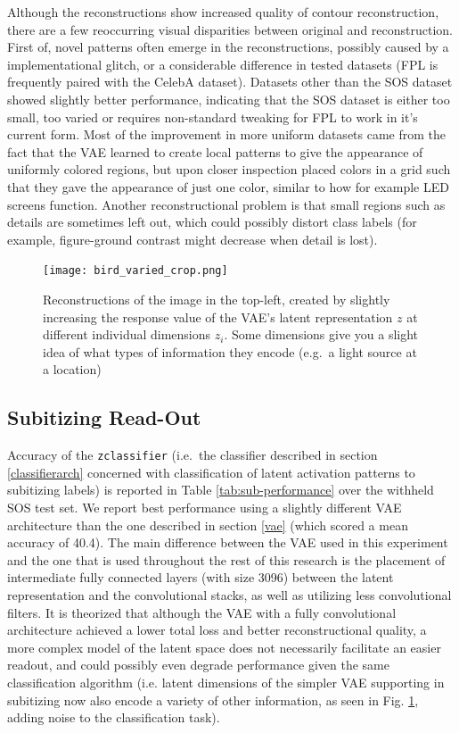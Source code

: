 \documentclass[twocolumn]{article}
\begin{document}
Although the reconstructions show increased quality of contour
reconstruction, there are a few reoccurring visual disparities between
original and reconstruction. First of, novel patterns often emerge in
the reconstructions, possibly caused by a implementational glitch, or a
considerable difference in tested datasets (FPL is frequently paired
with the CelebA \citet{liu2015deep} dataset). Datasets other than the
SOS dataset showed slightly better performance, indicating that the SOS
dataset is either too small, too varied or requires non-standard tweaking
for FPL to work in it's current form. Most of the improvement in more
uniform datasets came from the fact that the VAE learned to create 
local patterns to give the appearance of uniformly colored regions, but
upon closer inspection placed colors in a grid such that they
gave the appearance of just one color, similar to how for example LED
screens function. Another reconstructional problem is that small regions such as details are sometimes left out, which
could possibly distort class labels (for example, figure-ground contrast might decrease when detail is lost).

\begin{figure}
\centering
\texttt{[image: bird\_varied\_crop.png]}
\caption{Reconstructions of the image in the top-left, created by slightly
increasing the response value of the VAE's latent representation \(z\) at different individual dimensions \(z_i\). Some dimensions give
you a slight idea of what types of information they encode (e.g.~a light source at a
location)}
\label{fig:latent}
\end{figure}

\hypertarget{subitizing-read-out}{%
\subsection{Subitizing Read-Out}\label{subitizing-read-out}}

Accuracy of the \texttt{zclassifier} (i.e.~the classifier described
in section \ref{classifierarch} concerned
with classification of latent activation patterns to subitizing labels)
is reported in Table \ref{tab:sub-performance} over the withheld SOS test set. We report best performance using a slightly different VAE architecture than the one described in
section \ref{vae} (which scored a mean accuracy of 40.4).
The main difference between the VAE used in this experiment and the one
that is used throughout the rest of this research is the placement of
intermediate fully connected layers (with size 3096) between the latent
representation and the convolutional stacks, as well as utilizing less convolutional filters. It is theorized that although the VAE with a fully convolutional architecture achieved a lower total loss and better reconstructional quality, a more complex model of the latent space does not necessarily facilitate an easier readout, and could possibly even degrade performance given the same classification algorithm (i.e. latent dimensions of the simpler VAE supporting in subitizing now also encode a variety of other information, as seen in Fig. \ref{fig:latent}, adding noise to the classification task). 
\end{document}
